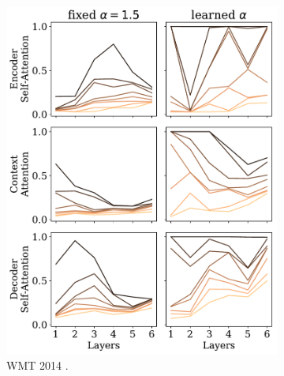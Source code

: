 \begin{figure}[!htbp]
    \begin{subfigure}[b]{.49\linewidth}
        \includegraphics[width=\linewidth]{Figures/head_density_per_layer.pdf}
        \caption{%
            \label{fig:head_density_per_layer_en}%
            WMT 2014 .}
    \end{subfigure}
    \begin{subfigure}[b]{.49\linewidth}

\end{subfigure}
\end{figure}
